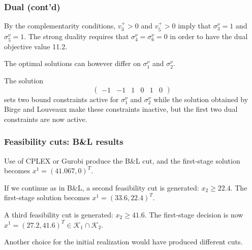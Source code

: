 \documentclass{beamer}
\def\cK{\mathcal{K}}
\begin{document}

\begin{frame}
\frametitle{Dual (cont'd)}	

By the complementarity conditions, $v_3^+ > 0$ and $v_5^+ > 0$ imply that $\sigma_3^{\nu} = 1$ and $\sigma_5^{\nu} = 1$. %
The strong duality requires that $\sigma_4^{\nu} = \sigma_6^{\nu} = 0$ in order to have the dual objective value 11.2.

\mbox{}

The optimal solutions can however differ on $\sigma_1^{\nu}$ and $\sigma_2^{\nu}$. %

\mbox{}


The solution
\[
\begin{pmatrix} -1 & -1 & 1 & 0 & 1 & 0 \end{pmatrix}
\]
sets two bound constraints active for $\sigma_1^{\nu}$ and $\sigma_2^{\nu}$
while the solution obtained by Birge and Louveaux make these constraints inactive, but the first two dual constraints are now active.

\end{frame}

\begin{frame}
	\frametitle{Feasibility cuts: B\&L results}

Use of CPLEX or Gurobi produce the B\&L cut, and
 the first-stage solution becomes $x^1 = (41.067,0)^T$.
	
	\mbox{}
	
If we continue as in B\&L, a second feasibility cut is generated: $x_2 \geq 22.4$.
The first-stage solution becomes $x^1 = (33.6, 22.4)^T$.
	
	\mbox{}
	
	A third feasibility cut is generated: $x_2 \geq 41.6$.
	The first-stage decision is now $x^1 = (27.2, 41.6)^T \in \cK_1 \cap \cK_2$.
	
	\mbox{}
	
	Another choice for the initial realization would have produced different cuts.
	
\end{frame}
\end{document}
